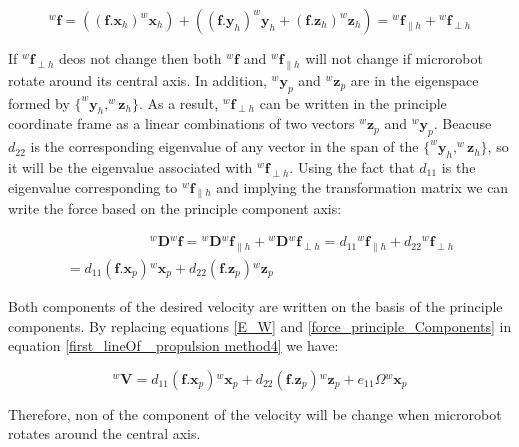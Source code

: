 \documentclass[12pt,a4paper,titlepage]{report}
\begin{document}
\begin{equation}
{^{w}\bm{f}} = \left ( (\bm{f} . \bm{x}_h) ^{w}\bm{x}_h \right) +  \left ( (\bm{f} . \bm{y}_h) ^{w}\bm{y}_h
 +  (\bm{f} . \bm{z}_h) ^{w}\bm{z}_h \right) = {^{w}\bm{f}}_{\parallel h} + {^{w}\bm{f}}_{\perp h}
\label{f_Component_globalAxis}
\end{equation}

If ${^{w}\bm{f}}_{\perp h}$ deos not change then both ${^{w}\bm{f}}$ and ${^{w}\bm{f}}_{\parallel h}$ will 
not change if microrobot rotate around its central axis. In addition, $^{w}\bm{y}_p$ and $^{w}\bm{z}_p$ are 
in the eigenspace formed by $\{ ^{w}\bm{y}_h ,   ^{w}\bm{z}_h  \}$. As a result, ${^{w}\bm{f}}_{\perp h}$ can be written in the 
principle coordinate frame as a linear combinations of two vectors ${^{w}\bm{z}}_{p}$ and 
${^{w}\bm{y}}_{p}$. Beacuse $d_{22}$ is the corresponding eigenvalue of any vector in the span of the
 $\{ ^{w}\bm{y}_h , ^{w}\bm{z}_h  \}$, so it will be the eigenvalue associated with ${^{w}\bm{f}}_{\perp h}$.
Using the fact that $d_{11}$ is the eigenvalue corresponding to $ {^{w}\bm{f}}_{\parallel h} $ and implying 
the transformation matrix we can write the force based on the principle component axis:
   


\begin{multline}
\qquad \qquad     \qquad   {^{w}\bm{D}} {^{w}\bm{f}} = {^{w}\bm{D}} {^{w}\bm{f}}_{\parallel h} + {^{w}\bm{D}} {^{w}\bm{f}}_{\perp h}
= d_{11} {^{w}\bm{f}}_{\parallel h} + d_{22}  {^{w}\bm{f}}_{\perp h}\\ 
= d_{11} \left ({\bm{f} . {\bm{x}}_p   }  \right) {^{w}\bm{x}}_p + 
 d_{22} \left ({\bm{f} . {\bm{z}}_p   }  \right) {^{w}\bm{z}}_p  \qquad \qquad
\label{force_principle_Components}
\end{multline} 

Both components  of the desired velocity are written on the basis of the principle components.
By replacing equations \ref{E_W} and \ref{force_principle_Components} in equation \ref{first_lineOf_ propulsion method4} we have:



\begin{equation}
^{w}\bm{V}  =   d_{11} \left ({\bm{f} . {\bm{x}}_p   }  \right) {^{w}\bm{x}}_p + 
 d_{22} \left ({\bm{f} . {\bm{z}}_p   }  \right) {^{w}\bm{z}}_p + e_{11} \Omega {^{w}{\bm{x}_p}}
\label{velocity_based_principle}  
\end{equation}

Therefore, non of the component of the velocity will be change when microrobot rotates around the central
axis. 
\end{document}
